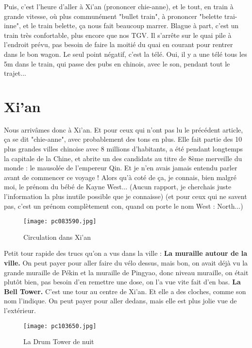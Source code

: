 \documentclass{book}
\begin{document}
Puis, c'est l'heure d'aller à Xi'an (prononcer chie-anne), et le tout, en train à grande vitesse, où plus communément "bullet train", à prononcer "belette trai-inne", et le train belette, ça nous fait beaucoup marrer. Blague à part, c'est un train très confortable, plus encore que nos TGV. Il s'arrête sur le quai pile à l'endroit prévu, pas besoin de faire la moitié du quai en courant pour rentrer dans le bon wagon. Le seul point négatif, c'est la télé. Oui, il y a une télé tous les 5m dans le train, qui passe des pubs en chinois, avec le son, pendant tout le trajet...



\chapter{Xi'an}
Nous arrivâmes donc à Xi'an. Et pour ceux qui n'ont pas lu le précédent article, ça se dit "chie-anne", avec probablement des tons en plus. Elle fait partie des 10 plus grandes villes chinoise avec 8 millions d'habitants, a été pendant longtemps la capitale de la Chine, et abrite un des candidats au titre de 8ème merveille du monde : le mausolée de l'empereur Qin. Et je n'en avais jamais entendu parler avant de commencer ce voyage ! Alors qu'à coté de ça, je connais, bien malgré moi, le prénom du bébé de Kayne West... (Aucun rapport, je cherchais juste l'information la plus inutile possible que je connaisse) (et pour ceux qui ne savent pas, c'est un prénom complètement con, quand on porte le nom West : North...)


\begin{figure}[h]
\centering
\texttt{[image: pc083590.jpg]}
\caption*{Circulation dans Xi'an}
\end{figure}

 Petit tour rapide des trucs qu'on a vus dans la ville :
\textbf{La muraille autour de la ville.} On peut payer pour aller faire du vélo dessus, mais bon, on avait déjà vu la grande muraille de Pékin et la muraille de Pingyao, donc niveau muraille, on était plutôt bien, pas besoin d'en remettre une dose, on l'a vue vite fait d'en bas.
\textbf{ La Bell Tower.} C'est une tour au centre de Xi'an. Et elle a des cloches, comme son nom l'indique. On peut payer pour aller dedans, mais elle est plus jolie vue de l'extérieur.


\begin{figure}[h]
\centering
\texttt{[image: pc103650.jpg]}
\caption*{La Drum Tower de nuit}
\end{figure}
\end{document}
